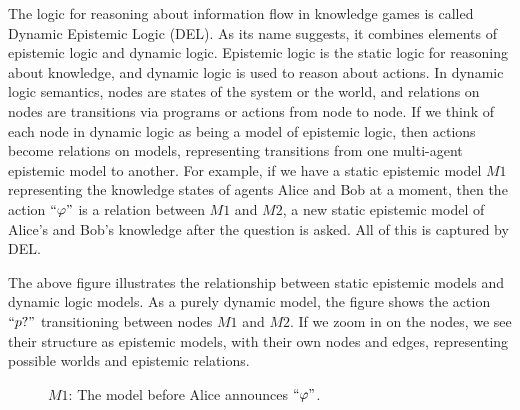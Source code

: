 The logic for reasoning about information flow in knowledge games is called Dynamic Epistemic Logic (DEL). As its name suggests, it combines elements of epistemic logic and dynamic logic. Epistemic logic is the static logic for reasoning about knowledge, and dynamic logic is used to reason about actions. In dynamic logic semantics, nodes are states of the system or the world, and relations on nodes are transitions via programs or actions from node to node. If we think of each node in dynamic logic as being a model of epistemic logic, then actions become relations on models, representing transitions from one multi-agent epistemic model to another. For example, if we have a static epistemic model $M1$ representing the knowledge states of agents Alice and Bob at a moment, then the action $``\varphi"$ is a relation between $M1$ and $M2$, a new static epistemic model of Alice's and Bob's knowledge after the question is asked. All of this is captured by DEL.

\begin {center}
\end{center}


The above figure illustrates the relationship between static epistemic models and dynamic logic models. As a purely dynamic model, the figure shows the action $``p?"$ transitioning between nodes $M1$ and $M2$. If we zoom in on the nodes, we see their structure as epistemic models, with their own nodes and edges, representing possible worlds and epistemic relations.
\begin{figure}[H]
\begin{center}
\end{center}
\caption{$M1$: The model before Alice announces $``\varphi"$.}
\end{figure}

